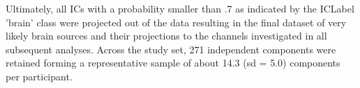 Ultimately, all ICs with a probability smaller than .7 as indicated by the ICLabel 'brain' class were projected out of the data resulting in the final dataset of very likely brain sources and their projections to the channels investigated in all subsequent analyses. Across the study set, 271 independent components were retained forming a representative sample of about 14.3 (sd = 5.0) components per participant. 






